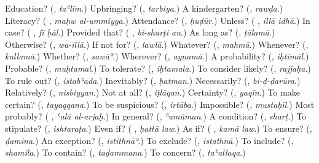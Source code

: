 \begin{tcolorbox}[breakable,colback=teal!4,colframe=teal!35!black,title={Before you move on}]
Education? (\textbf{}, \emph{taʿlīm}.) Upbringing? (\textbf{}, \emph{tarbiya}.) A kindergarten? (\textbf{}, \emph{rawḍa}.) Literacy? (\textbf{ }, \emph{maḥw al-ummiyya}.) Attendance? (\textbf{}, \emph{ḥuḍūr}.) Unless? (\textbf{ }, \emph{illā idhā}.) In case? (\textbf{ }, \emph{fī ḥāl}.) Provided that? (\textbf{ }, \emph{bi-sharṭi an}.) As long as? (\textbf{}, \emph{ṭālamā}.) Otherwise? (\textbf{}, \emph{wa-illā}.) If not for? (\textbf{}, \emph{lawlā}.) Whatever? (\textbf{}, \emph{mahmā}.) Whenever? (\textbf{}, \emph{kullamā}.) Whether? (\textbf{}, \emph{sawāʾ}.) Wherever? (\textbf{}, \emph{aynamā}.) A probability? (\textbf{}, \emph{iḥtimāl}.) Probable? (\textbf{}, \emph{muḥtamal}.) To tolerate? (\textbf{}, \emph{iḥtamala}.) To consider likely? (\textbf{}, \emph{rajjaḥa}.) To rule out? (\textbf{}, \emph{istabʿada}.) Inevitably? (\textbf{}, \emph{ḥatman}.) Necessarily? (\textbf{}, \emph{bi-ḍ-ḍarūra}.) Relatively? (\textbf{}, \emph{nisbiyyan}.) Not at all? (\textbf{}, \emph{iṭlāqan}.) Certainty? (\textbf{}, \emph{yaqīn}.) To make certain? (\textbf{}, \emph{tayaqqana}.) To be suspicious? (\textbf{}, \emph{irtāba}.) Impossible? (\textbf{}, \emph{mustaḥīl}.) Most probably? (\textbf{ }, \emph{ʿalā al-arjaḥ}.) In general? (\textbf{}, \emph{ʿumūman}.) A condition? (\textbf{}, \emph{sharṭ}.) To stipulate? (\textbf{}, \emph{ishtaraṭa}.) Even if? (\textbf{ }, \emph{ḥattā law}.) As if? (\textbf{ }, \emph{kamā law}.) To ensure? (\textbf{}, \emph{ḍamina}.) An exception? (\textbf{}, \emph{istithnāʾ}.) To exclude? (\textbf{}, \emph{istathnā}.) To include? (\textbf{}, \emph{shamila}.) To contain? (\textbf{}, \emph{taḍammana}.) To concern? (\textbf{}, \emph{taʿallaqa}.)
\end{tcolorbox}
